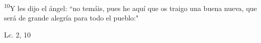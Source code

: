 \documentclass[../../rosario.tex]{subfiles}
\begin{document}
    \textsuperscript{10}Y les dijo el ángel: ``no temáis, pues he aquí que os traigo una buena nueva, que será de grande alegría para todo el pueblo:"
    \begin{flushright}
    Lc. 2, 10         
    \end{flushright}
\end{document}
